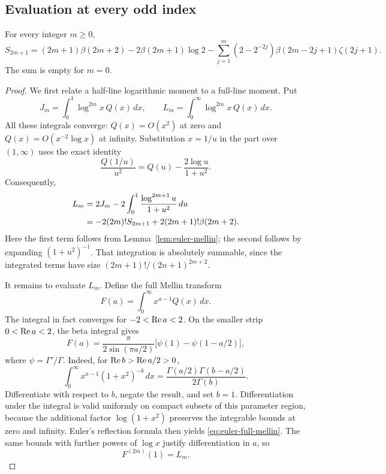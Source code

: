 \subsection{Evaluation at every odd index}

\begin{theorem}\label{thm:euler-odd}
For every integer \(m\ge0\),
\begin{equation}
\boxed{\displaystyle
S_{2m+1}=(2m+1)\beta(2m+2)-2\beta(2m+1)\log2
-\sum_{j=1}^{m}(2-2^{-2j})
 \beta(2m-2j+1)\zeta(2j+1).}
\label{eq:euler-odd}
\end{equation}
The sum is empty for \(m=0\).
\end{theorem}

\begin{proof}
We first relate a half-line logarithmic moment to a full-line moment.
Put
\[
J_m=\int_0^1\log^{2m}x\,Q(x)\,dx,
\qquad
L_m=\int_0^{\infty}\log^{2m}x\,Q(x)\,dx.
\]
All these integrals converge: \(Q(x)=O(x^2)\) at zero and
\(Q(x)=O(x^{-2}\log x)\) at infinity.
Substitution \(x=1/u\) in the part over \((1,\infty)\) uses the
exact identity
\[
\frac{Q(1/u)}{u^2}
=Q(u)-\frac{2\log u}{1+u^2}.
\]
Consequently,
\begin{align}
L_m
&=2J_m-2\int_0^1\frac{\log^{2m+1}u}{1+u^2}\,du\notag\\
&=-2(2m)!S_{2m+1}+2(2m+1)!\beta(2m+2).
\label{eq:euler-inversion}
\end{align}
Here the first term follows from Lemma~\ref{lem:euler-mellin}; the
second follows by expanding \((1+u^2)^{-1}\). That integration is
absolutely summable, since the integrated terms have size
\((2m+1)!/(2n+1)^{2m+2}\).

It remains to evaluate \(L_m\). Define the full Mellin transform
\[
F(a)=\int_0^{\infty}x^{a-1}Q(x)\,dx.
\]
The integral in fact converges for \(-2<\operatorname{Re} a<2\). On the
smaller strip \(0<\operatorname{Re} a<2\), the beta integral gives
\begin{equation}
F(a)=\frac{\pi}{2\sin(\pi a/2)}
       \bigl[\psi(1)-\psi(1-a/2)\bigr],
\label{eq:euler-full-mellin}
\end{equation}
where \(\psi=\Gamma'/\Gamma\). Indeed, for
\(\operatorname{Re} b>\operatorname{Re} a/2>0\),
\[
\int_0^{\infty}x^{a-1}(1+x^2)^{-b}\,dx
=\frac{\Gamma(a/2)\Gamma(b-a/2)}{2\Gamma(b)}.
\]
Differentiate with respect to \(b\), negate the result, and set
\(b=1\). Differentiation under the integral is valid uniformly on
compact subsets of this parameter region, because the additional
factor \(\log(1+x^2)\) preserves the integrable bounds at zero
and infinity. Euler's reflection formula then yields
\eqref{eq:euler-full-mellin}. The same bounds with further powers
of \(\log x\) justify differentiation in \(a\), so
\begin{equation}
F^{(2m)}(1)=L_m.
\label{eq:euler-moments}
\end{equation}


\end{proof}
